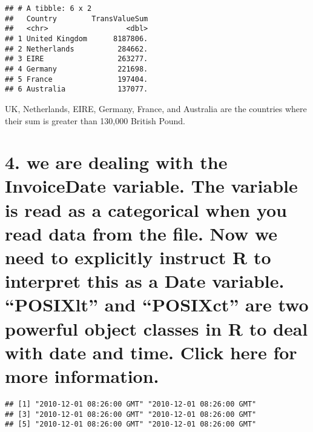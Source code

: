 \documentclass[
]{article}
\newenvironment{Shaded}{\begin{snugshade}}{\end{snugshade}}
\newcommand{\AttributeTok}[1]{\textcolor[rgb]{0.77,0.63,0.00}{#1}}
\newcommand{\FunctionTok}[1]{\textcolor[rgb]{0.00,0.00,0.00}{#1}}
\newcommand{\NormalTok}[1]{#1}
\newcommand{\OtherTok}[1]{\textcolor[rgb]{0.56,0.35,0.01}{#1}}
\newcommand{\SpecialCharTok}[1]{\textcolor[rgb]{0.00,0.00,0.00}{#1}}
\newcommand{\StringTok}[1]{\textcolor[rgb]{0.31,0.60,0.02}{#1}}
\begin{document}
\begin{verbatim}
## # A tibble: 6 x 2
##   Country        TransValueSum
##   <chr>                  <dbl>
## 1 United Kingdom      8187806.
## 2 Netherlands          284662.
## 3 EIRE                 263277.
## 4 Germany              221698.
## 5 France               197404.
## 6 Australia            137077.
\end{verbatim}

UK, Netherlands, EIRE, Germany, France, and Australia are the countries
where their sum is greater than 130,000 British Pound.

\hypertarget{we-are-dealing-with-the-invoicedate-variable.-the-variable-is-read-as-a-categorical-when-you-read-data-from-the-file.-now-we-need-to-explicitly-instruct-r-to-interpret-this-as-a-date-variable.-posixlt-and-posixct-are-two-powerful-object-classes-in-r-to-deal-with-date-and-time.-click-here-for-more-information.}{%
\section{4. we are dealing with the InvoiceDate variable. The variable
is read as a categorical when you read data from the file. Now we need
to explicitly instruct R to interpret this as a Date variable.
``POSIXlt'' and ``POSIXct'' are two powerful object classes in R to deal
with date and time. Click here for more
information.}\label{we-are-dealing-with-the-invoicedate-variable.-the-variable-is-read-as-a-categorical-when-you-read-data-from-the-file.-now-we-need-to-explicitly-instruct-r-to-interpret-this-as-a-date-variable.-posixlt-and-posixct-are-two-powerful-object-classes-in-r-to-deal-with-date-and-time.-click-here-for-more-information.}}

\begin{Shaded}
\end{Shaded}

\begin{verbatim}
## [1] "2010-12-01 08:26:00 GMT" "2010-12-01 08:26:00 GMT"
## [3] "2010-12-01 08:26:00 GMT" "2010-12-01 08:26:00 GMT"
## [5] "2010-12-01 08:26:00 GMT" "2010-12-01 08:26:00 GMT"
\end{verbatim}
\end{document}
